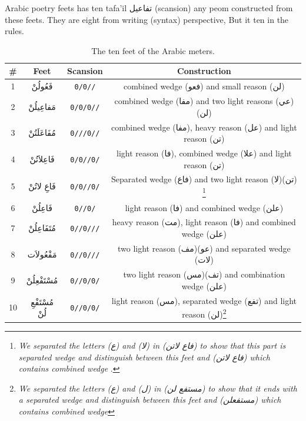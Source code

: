 Arabic poetry feets has ten tafa'il \textarabic{تفاعيل} (scansion)  any peom constructed from these feets. They are eight from writing (syntax) perspective, But it ten in the rules.
\begin{savenotes}

\begin{table}[H]
  \centering
  \begin{tabular}{|c|c|c|c|}
    \hline
    \textbf{\#} & \textbf{Feet} & \textbf{Scansion} & \textbf{Construction} \\
    \hline
    1 & \textarabic{فَعُولُنْ}  & \texttt{0/0//} & combined wedge (\textarabic{فعو}) and small reason (\textarabic{لن})   \\
    2 &\textarabic{مَفاعِيلُنْ}& \texttt{0/0/0//} & combined wedge (\textarabic{مفا}) and two light reasons (\textarabic{عي}) (\textarabic{لن})   \\
    3 &\textarabic{مُفَاعَلَتُنْ}& \texttt{0///0//}  &    combined wedge (\textarabic{مفا}), heavy reason (\textarabic{عل}) and light reason (\textarabic{تن}) \\
    4 &\textarabic{فَاعِلاَتُنْ} & \texttt{0/0//0/}   & light reason (\textarabic{فا}), combined wedge (\textarabic{علا}) and light reason (\textarabic{تن})   \\
    5 &\textarabic{فَاعِ لاتُنْ} & \texttt{0/0//0/}  &  Separated wedge (\textarabic{فاع}) and two light reason (\textarabic{لا})(\textarabic{تن}) \footnote{\textit{We separated the letters (\textarabic{ع}) and (\textarabic{لا}) in (\textarabic{فاع لاتن}) to show that this part is separated wedge and distinguish between this feet  and (\textarabic{فاع لاتن}) which contains combined wedge  }.}  \\
    6 &\textarabic{فَاعِلُنْ}  & \texttt{0//0/}   & light reason (\textarabic{فا}) and combined wedge (\textarabic{علن})\\
    7 &\textarabic{مُتَفَاعِلُنْ}& \texttt{0//0///}  & heavy reason (\textarabic{مت}), light reason (\textarabic{فا}) and combined wedge (\textarabic{علن})  \\
    8 &\textarabic{مَفْعُولاَت} & \texttt{0//0///}   & two light reason (\textarabic{مف})(\textarabic{عو}) and separated wedge (\textarabic{لات}) \\
    9 &\textarabic{مُسْتَفْعِلُنْ} & \texttt{0//0/0/}  &  two light reason (\textarabic{مس})(\textarabic{تف}) and combination wedge (\textarabic{علن}) \\
    10 &\textarabic{مُسْتَفْعِ لُنْ} & \texttt{0//0/0/}  & light reason (\textarabic{مس}), separated wedge  (\textarabic{تفع}) and light reason  (\textarabic{لن})\footnote{\textit{We separated the letters (\textarabic{ع}) and (\textarabic{ل}) in (\textarabic{مستفع لن}) to show that it ends with a separated wedge and distinguish between this feet  and (\textarabic{مستفعلن}) which contains combined wedge }}\\


    \hline
  \end{tabular}
  \caption{The ten feet of the Arabic meters. }\label{arud:feet}
\end{table}
    \end{savenotes}

